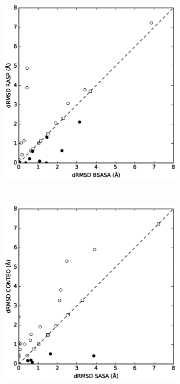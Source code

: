 \begin{figure}[hp] 
  \begin{subfigure}{.55\linewidth}
    \centering 
    \includegraphics[width=\linewidth]{figures/resultados/rna/farfar/drmsd/BSASA_RASP_.eps}
    \caption{}
  \end{subfigure}%
~
  \begin{subfigure}{.55\linewidth}
    \includegraphics[width=\linewidth]{figures/resultados/rna/farfar/drmsd/SASA_CONTEO_.eps}
    \caption{}
  \end{subfigure}


\end{figure}
